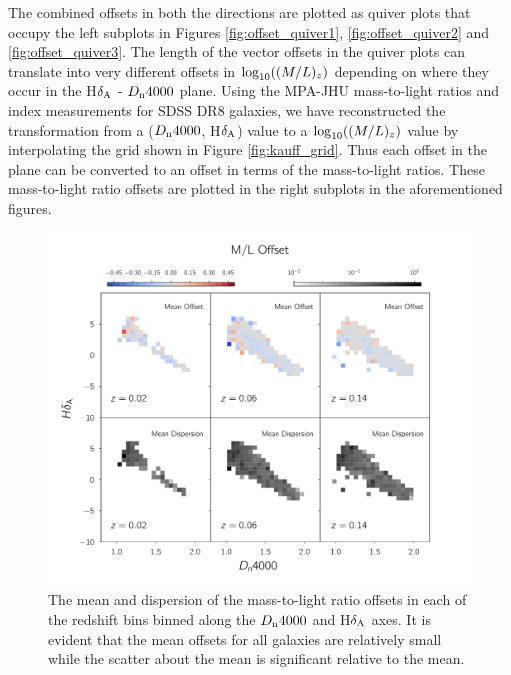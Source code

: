 The combined offsets in both the directions are plotted as quiver 
plots that occupy the left subplots in Figures \ref{fig:offset_quiver1}, 
\ref{fig:offset_quiver2} and \ref{fig:offset_quiver3}. The length of 
the vector offsets in the quiver plots can translate into very 
different offsets in ${\rm log}_{10}((M/L)_{z})$ depending on 
where they occur in the H$\delta_{\rm A}$ - $D_{\rm n}4000$ plane. 
Using the MPA-JHU mass-to-light ratios and index measurements 
for SDSS DR8 galaxies, we have reconstructed the transformation 
from a ($D_{\rm n}4000$, H$\delta_{\rm A}$) value to a 
${\rm log}_{10}((M/L)_{z})$ value by interpolating the grid 
shown in Figure \ref{fig:kauff_grid}. Thus each offset in the 
plane can be converted to an offset in terms of the 
mass-to-light ratios. These mass-to-light ratio offsets are 
plotted in the right subplots in the aforementioned figures.\\ 
\begin{figure}
\includegraphics[width=\textwidth]{figures/ml_offset_plot.pdf}
\caption[ The mean and dispersion of the mass-to-light ratio 
offsets in each of the redshift bins binned along the $D_{\rm n}4000$ 
and H$\delta_{\rm A}$ axes. It is evident that the mean offsets for 
all galaxies are relatively small while the scatter about the mean
is significant relative to the mean.]{The mean and dispersion of the mass-to-light ratio 
offsets in each of the redshift bins binned along the $D_{\rm n}4000$ 
and H$\delta_{\rm A}$ axes. It is evident that the mean offsets for 
all galaxies are relatively small while the scatter about the mean
is significant relative to the mean.
\label{dispersion_plot}}
\end{figure}

